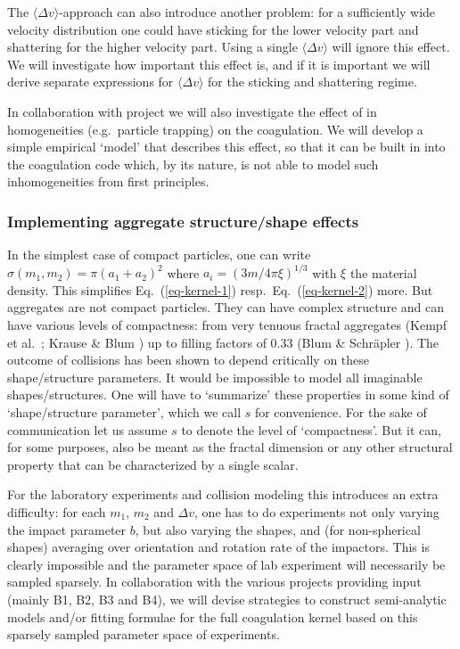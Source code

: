 The $\langle\Delta v\rangle$-approach can also introduce another problem:
for a sufficiently wide velocity distribution one could have sticking for
the lower velocity part and shattering for the higher velocity part.
Using a single $\langle\Delta v\rangle$ will ignore this effect. We will
investigate how important this effect is, and if it is important we will 
derive separate expressions for $\langle\Delta v\rangle$ for the
sticking and shattering regime.

In collaboration with project \projklahr{} we will also investigate the
effect of in homogeneities (e.g.~particle trapping) on the coagulation. 
We will develop a simple empirical `model' that describes this effect,
so that it can be built in into the coagulation code which, by its nature,
is not able to model such inhomogeneities from first principles.

\subsubsection{Implementing aggregate structure/shape effects}
In the simplest case of compact particles, one can write
$\sigma(m_1,m_2)=\pi(a_1+a_2)^2$ where $a_i=(3m/4\pi\xi)^{1/3}$ with $\xi$
the material density. This
simplifies Eq.~(\ref{eq-kernel-1}) resp.\ Eq.~(\ref{eq-kernel-2}) more.  But
aggregates are not compact particles. They can have complex structure and
can have various levels of compactness: from very tenuous fractal aggregates
(Kempf et al.~; Krause \& Blum ) up to filling factors
of 0.33 (Blum \& Schr\"apler ). The outcome of collisions has been
shown to depend critically on these shape/structure parameters. It would be
impossible to model all imaginable shapes/structures. One will have to
`summarize' these properties in some kind of `shape/structure parameter',
which we call $s$ for convenience. For the sake of communication let us
assume $s$ to denote the level of `compactness'. But it can, for some
purposes, also be meant as the fractal dimension or any other structural
property that can be characterized by a single scalar.

For the laboratory experiments and collision modeling this introduces an
extra difficulty: for each $m_1$, $m_2$ and $\Delta v$, one has to do
experiments not only varying the impact parameter $b$, but also varying the
shapes, and (for non-spherical shapes) averaging over orientation and
rotation rate of the impactors. This is clearly impossible and the parameter
space of lab experiment will necessarily be sampled sparsely. In
collaboration with the various projects providing input (mainly B1, B2, B3
and B4), we will devise strategies to construct semi-analytic models and/or
fitting formulae for the full coagulation kernel based on this sparsely
sampled parameter space of experiments.

